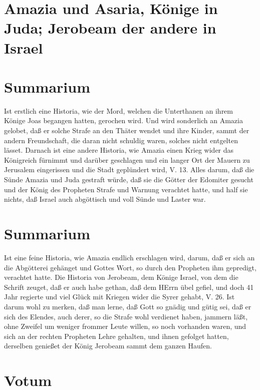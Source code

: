 \section[Amazia und Asaria, Könige in Juda; Jerobeam der]{Amazia und Asaria, Könige in Juda; Jerobeam der andere in Israel}

\section{Summarium}

Ist erstlich eine Historia, wie der Mord, welchen die Unterthanen an ihrem Könige Joas begangen hatten, gerochen wird. Und wird sonderlich an Amazia gelobet, daß er solche Strafe an den Thäter wendet und ihre Kinder, sammt der andern Freundschaft, die daran nicht schuldig waren, solches nicht entgelten lässet. Darnach ist eine andere Historia, wie Amazia einen Krieg wider das Königreich fürnimmt und darüber geschlagen und ein langer Ort der Mauern zu Jerusalem eingerissen und die Stadt geplündert wird, V. 13. Alles darum, daß die Sünde Amazia und Juda gestraft würde, daß sie die Götter der Edomiter gesucht und der König des Propheten Strafe und Warnung verachtet hatte, und half sie nichts, daß Israel auch abgöttisch und voll Sünde und Laster war.

\section{Summarium}

Ist eine feine Historia, wie Amazia endlich erschlagen wird, darum, daß er sich an die Abgötterei gehänget und Gottes Wort, so durch den Propheten ihm gepredigt, verachtet hatte.
Die Historia von Jerobeam, dem Könige Israel, von dem die Schrift zeuget, daß er auch habe gethan, daß dem HErrn übel gefiel, und doch 41 Jahr regierte und viel Glück mit Kriegen wider die Syrer gehabt, V. 26. Ist darum wohl zu merken, daß man lerne, daß Gott so gnädig und gütig sei, daß er sich des Elendes, auch derer, so die Strafe wohl verdienet haben, jammern läßt, ohne Zweifel um weniger frommer Leute willen, so noch vorhanden waren, und sich an der rechten Propheten Lehre gehalten, und ihnen gefolget hatten, derselben genießet der König Jerobeam sammt dem ganzen Haufen.

\section{Votum}

